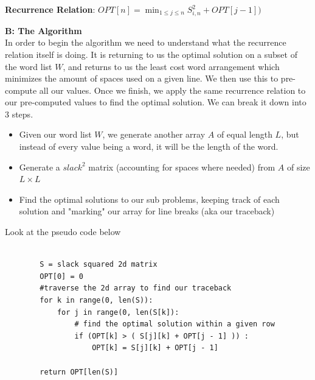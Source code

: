 \documentclass[11pt]{article}
\begin{document}
\begin{solution}
		\hfil
		
		
		\begin{center}
			\textbf{Recurrence Relation}: $OPT[n] = \displaystyle\min_{1\leq j \leq n} S^2_{i,n}+ OPT[j - 1])$
		\end{center}
		
		
		
	
	\hfil
	
	\textbf{B: The Algorithm} \\
	
	In order to begin the algorithm we need to understand what the recurrence relation itself is doing. It is returning to us the optimal solution on a subset of the word list $W$, and returns to us the least cost word arrangement which minimizes the amount of spaces used on a given line. We then use this to pre-compute all our values. Once we finish, we apply the same recurrence relation to our pre-computed values to find the optimal solution. We can break it down into 3 steps.  
	
	\begin{itemize}
		\item Given our word list $W$, we generate another array $A$ of equal length $L$, but instead of every value being a word, it will be the length of the word.
  		\item Generate a $slack^2$ matrix (accounting for spaces where needed) from $A$ of size $L \times L$ 
  		\item Find the optimal solutions to our sub problems, keeping track of each solution and "marking" our array for line breaks (aka our traceback)
	\end{itemize}
	
	\hfil
	
		Look at the pseudo code below
		
	\hfil	
	
	
	
    
    
	\begin{lstlisting}
	
		S = slack squared 2d matrix
		OPT[0] = 0
		#traverse the 2d array to find our traceback
		for k in range(0, len(S)):
			for j in range(0, len(S[k]):
				# find the optimal solution within a given row
				if (OPT[k] > ( S[j][k] + OPT[j - 1] )) :
					OPT[k] = S[j][k] + OPT[j - 1]
		
		return OPT[len(S)]
		
		 
	\end{lstlisting}
	
	\hfil
	



\end{solution}



\begin{solution}
	
\end{solution}
\end{document}

